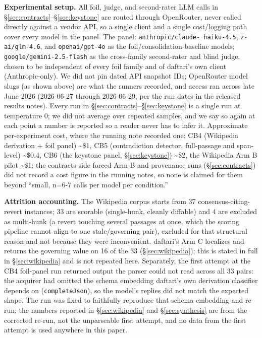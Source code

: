 \documentclass[11pt]{article}
\begin{document}
\textbf{Experimental setup.} All foil, judge, and second-rater LLM calls in \S\ref{sec:contracts}--\S\ref{sec:keystone} are routed
through OpenRouter, never called directly against a vendor API, so a single client and a
single cost/logging path cover every model in the panel. The panel: \texttt{anthropic/claude-
haiku-4.5}, \texttt{z-ai/glm-4.6}, and \texttt{openai/gpt-4o} as the foil/consolidation-baseline models;
\texttt{google/gemini-2.5-flash} as the cross-family second-rater and blind judge, chosen to be
independent of every foil family and of daftari's own client (Anthropic-only). We did not
pin dated API snapshot IDs; OpenRouter model slugs (as shown above) are what the runners
recorded, and access ran across late June 2026 (2026-06-27 through 2026-06-29, per the
run dates in the released results notes). Every run in \S\ref{sec:contracts}--\S\ref{sec:keystone} is a single run at temperature
0; we did not average over repeated samples, and we say so again at each point a number is
reported so a reader never has to infer it. Approximate per-experiment cost, where the
running note recorded one: CB4 (Wikipedia derivation + foil panel) \textasciitilde\$1, CB5 (contradiction
detector, full-passage and span-level) \textasciitilde\$0.4, CB6 (the keystone panel, \S\ref{sec:keystone}) \textasciitilde\$2, the
Wikipedia Arm B pilot \textasciitilde\$1; the contracts-side forced-Arm-B and provenance runs (\S\ref{sec:contracts}) did not
record a cost figure in the running notes, so none is claimed for them beyond ``small,
n=6-7 calls per model per condition.''

\textbf{Attrition accounting.} The Wikipedia corpus starts from 37 consensus-citing-revert
instances; 33 are scorable (single-hunk, cleanly diffable) and 4 are excluded as multi-hunk
(a revert touching several passages at once, which the scoring pipeline cannot align to one
stale/governing pair), excluded for that structural reason and not because they were
inconvenient. daftari's Arm C localizes and returns the governing value on 16 of the 33 (\S\ref{sec:wikipedia});
this is stated in full in \S\ref{sec:wikipedia} and is not repeated here. Separately, the first attempt at the
CB4 foil-panel run returned output the parser could not read across all 33 pairs: the
acquirer had omitted the schema embedding daftari's own derivation classifier depends on
(\texttt{completeJson}), so the model's replies did not match the expected shape. The run was fixed
to faithfully reproduce that schema embedding and re-run; the numbers reported in \S\ref{sec:wikipedia} and \S\ref{sec:synthesis}
are from the corrected re-run, not the unparseable first attempt, and no data from the first
attempt is used anywhere in this paper.
\end{document}
